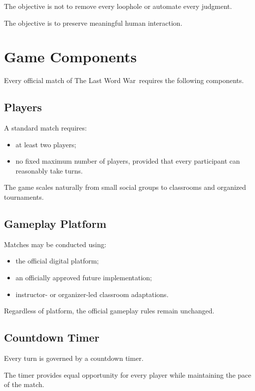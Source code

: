 \documentclass[11pt,a4paper]{article}
\begin{document}
The objective is not to remove every loophole or automate every judgment.

The objective is to preserve meaningful human interaction.

\section{Game Components}

Every official match of The Last Word War\texttrademark\ requires the following components.

\subsection{Players}

A standard match requires:

\begin{itemize}
    \item at least two players;
    \item no fixed maximum number of players, provided that every participant can reasonably take turns.
\end{itemize}

The game scales naturally from small social groups to classrooms and organized tournaments.

\subsection{Gameplay Platform}

Matches may be conducted using:

\begin{itemize}
    \item the official digital platform;
    \item an officially approved future implementation;
    \item instructor- or organizer-led classroom adaptations.
\end{itemize}

Regardless of platform, the official gameplay rules remain unchanged.

\subsection{Countdown Timer}

Every turn is governed by a countdown timer.

The timer provides equal opportunity for every player while maintaining the pace of the match.
\end{document}
